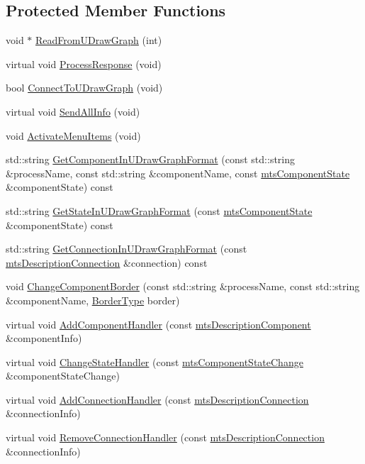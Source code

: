 \subsection*{Protected Member Functions}
\begin{DoxyCompactItemize}
\item 
void $\ast$ \hyperlink{classmts_component_viewer_aa5dd9cbc4a1d8408158e88311d3b447b}{Read\+From\+U\+Draw\+Graph} (int)
\item 
virtual void \hyperlink{classmts_component_viewer_a5adcc3b205fdb2d3b391929222137457}{Process\+Response} (void)
\item 
bool \hyperlink{classmts_component_viewer_a5ede805581fd5650f323f57ebb53eee6}{Connect\+To\+U\+Draw\+Graph} (void)
\item 
virtual void \hyperlink{classmts_component_viewer_adce96720fed764a7fc1cc9598c74b524}{Send\+All\+Info} (void)
\item 
void \hyperlink{classmts_component_viewer_ab8a3016cf3b814fff4132646c8545401}{Activate\+Menu\+Items} (void)
\item 
std\+::string \hyperlink{classmts_component_viewer_a94496c56f20040de1e87a0c36df1925a}{Get\+Component\+In\+U\+Draw\+Graph\+Format} (const std\+::string \&process\+Name, const std\+::string \&component\+Name, const \hyperlink{classmts_component_state}{mts\+Component\+State} \&component\+State) const 
\item 
std\+::string \hyperlink{classmts_component_viewer_a3c1f904308cac38bf80a506eece45e8f}{Get\+State\+In\+U\+Draw\+Graph\+Format} (const \hyperlink{classmts_component_state}{mts\+Component\+State} \&component\+State) const 
\item 
std\+::string \hyperlink{classmts_component_viewer_a3f1d129888db918924b042da0d84eebd}{Get\+Connection\+In\+U\+Draw\+Graph\+Format} (const \hyperlink{classmts_description_connection}{mts\+Description\+Connection} \&connection) const 
\item 
void \hyperlink{classmts_component_viewer_a4d5ea188a34cac5faa644618b1c55e2c}{Change\+Component\+Border} (const std\+::string \&process\+Name, const std\+::string \&component\+Name, \hyperlink{classmts_component_viewer_a2bd239a01fe3124526c4322e7305b99f}{Border\+Type} border)
\item 
virtual void \hyperlink{classmts_component_viewer_a119208a52ff869e4d7d687a04e8e1c08}{Add\+Component\+Handler} (const \hyperlink{classmts_description_component}{mts\+Description\+Component} \&component\+Info)
\item 
virtual void \hyperlink{classmts_component_viewer_a1efc788ff4196c270e6e2d185b8c6104}{Change\+State\+Handler} (const \hyperlink{classmts_component_state_change}{mts\+Component\+State\+Change} \&component\+State\+Change)
\item 
virtual void \hyperlink{classmts_component_viewer_ad9a2f2ba75fa8f47d4540ee448ba3983}{Add\+Connection\+Handler} (const \hyperlink{classmts_description_connection}{mts\+Description\+Connection} \&connection\+Info)
\item 
virtual void \hyperlink{classmts_component_viewer_a8ccf7105c4fa2b28f3f38fe9ea671806}{Remove\+Connection\+Handler} (const \hyperlink{classmts_description_connection}{mts\+Description\+Connection} \&connection\+Info)
\end{DoxyCompactItemize}
